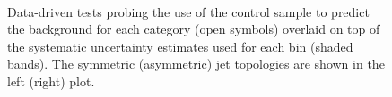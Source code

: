 \begin{figure}[h!]
  \begin{center}
    ~~
    \caption{Data-driven tests probing the use of the \mj control sample
      to predict the \znunu background for each
      \njet category (open symbols) overlaid on top of the systematic
      uncertainty estimates used for each \scalht bin (shaded bands).  
      The symmetric (asymmetric) jet topologies are shown in the left (right) plot. 
    }
    \label{fig:closureMuToMuMu}
  \end{center} 
\end{figure}

